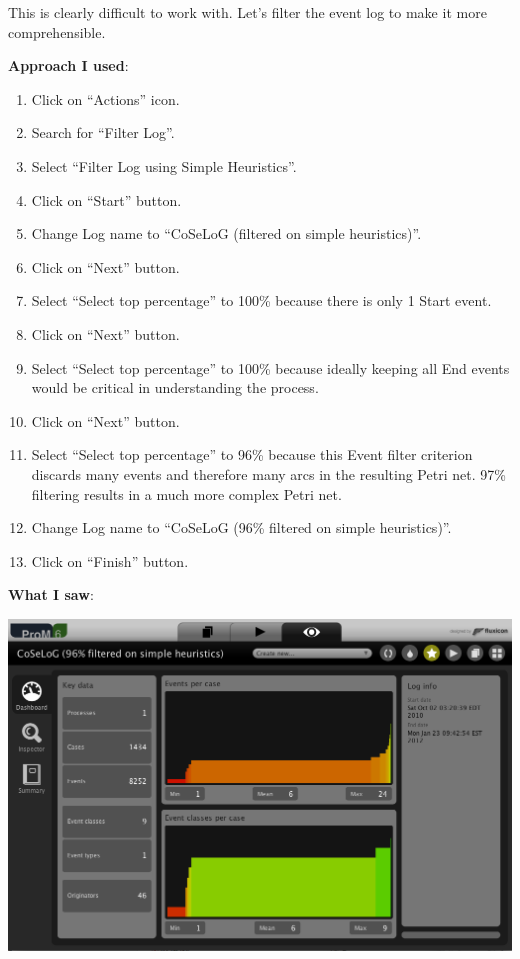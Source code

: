 \documentclass[]{article}
\begin{document}
This is clearly difficult to work with. Let's filter the event log to
make it more comprehensible.

\textbf{Approach I used}:

\begin{enumerate}
\def\labelenumi{\arabic{enumi}.}
\setcounter{enumi}{9}
\itemsep1pt\parskip0pt
\item
  Click on ``Actions'' icon.
\item
  Search for ``Filter Log''.
\item
  Select ``Filter Log using Simple Heuristics''.
\item
  Click on ``Start'' button.
\item
  Change Log name to ``CoSeLoG (filtered on simple heuristics)''.
\item
  Click on ``Next'' button.
\item
  Select ``Select top percentage'' to 100\% because there is only 1
  Start event.
\item
  Click on ``Next'' button.
\item
  Select ``Select top percentage'' to 100\% because ideally keeping all
  End events would be critical in understanding the process.
\item
  Click on ``Next'' button.
\item
  Select ``Select top percentage'' to 96\% because this Event filter
  criterion discards many events and therefore many arcs in the
  resulting Petri net. 97\% filtering results in a much more complex
  Petri net.\\
\item
  Change Log name to ``CoSeLoG (96\% filtered on simple heuristics)''.
\item
  Click on ``Finish'' button.
\end{enumerate}

\textbf{What I saw}:

\includegraphics{CoSeLoG_Step_05_Filter96.png}
\end{document}
